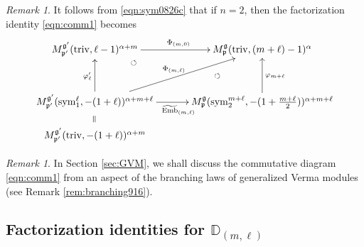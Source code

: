 \documentclass[reqno,11pt]{amsart}
\theoremstyle{remark}
\newtheorem{rem}[equation]{Remark}
\theoremstyle{definition}
\numberwithin{equation}{section}
\newcommand{\ga}{\alpha}
\newcommand{\fg}{{\mathfrak g}}
\newcommand{\fp}{{\mathfrak p}}
\newcommand{\triv}{\mathrm{triv}}
\newcommand{\sym}{\mathrm{sym}}
\newcommand{\Mp}{M^{\fg}_{\fp}}
\newcommand{\Mpp}{M^{\fg'}_{\fp'}}
\newcommand{\wEmb}{\widetilde{\mathrm{Emb}}}
\newcommand{\bD}{\mathbb{D}}
\begin{document}
\begin{rem}\label{rem:sym0826b}
It follows from \eqref{eqn:sym0826c} that if $n=2$, then the factorization 
identity \eqref{eqn:comm1} becomes
\begin{equation*}
\begin{aligned}
 \xymatrix@=13pt{
 \Mpp(\triv,\ell-1)^{\ga+m} 
 \ar@{}[rd]|{\circlearrowleft}
 \ar[rr]^{\Phi_{(m,0)}}
 && \Mp(\triv,(m+\ell)-1)^\ga\\
 &&\\
 \Mpp(\sym^\ell_{1},-(1+\ell))^{\ga+m+\ell}
\ar[uu]^{\varphi_{\ell}'}
 \ar[rr]_{\wEmb_{(m,\ell)}} \ar[rruu]^{\Phi_{(m,\ell)}} 
 \ar@{}[d]|{\rotatebox{90}{$=$}}
&&\Mp(\sym^{m+\ell}_2,-(1+\tfrac{m+\ell}{2}))^{\ga+m+\ell}
\ar[uu]_{\varphi_{m+\ell}}
\ar@{}[luu]|{\circlearrowleft}\\
 \Mpp(\triv,-(1+\ell))^{\ga+m} &&
}
\end{aligned}
\end{equation*}
\end{rem}

\begin{rem}
In Section \ref{sec:GVM}, we shall discuss the commutative diagram \eqref{eqn:comm1}
from an aspect of the branching laws of generalized Verma modules
(see Remark \ref{rem:branching916}). 
\end{rem}

\subsection{Factorization identities for $\bD_{(m,\ell)}$}
\label{sec:factorDSBO}
\end{document}
